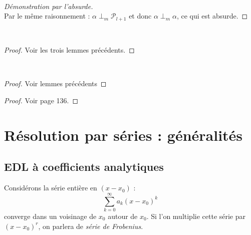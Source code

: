 	
	\ \\
	
\begin{proof} [Démonstration par l'absurde]\ \\
	Par le même raisonnement : $\alpha \perp_m \mathcal{P}_{l+1}$ et donc $\alpha 
	\perp_m \alpha$, ce qui est absurde.
\end{proof}
	
\ \\
	
\begin{proof}
	Voir les trois lemmes précédents.
\end{proof}
	
\ \\

\begin{proof}
	Voir lemmes précédents	
\end{proof}
	
	
\begin{proof}
	Voir page 136.
\end{proof}
	
	
\section{Résolution par séries : généralités}
	\subsection{EDL à coefficients analytiques}
	Considérons la série entière en $(x-x_0)$ :
	\begin{equation}
	\sum_{k=0}^\infty a_k(x-x_0)^k
	\end{equation}
	converge dans un voisinage de $x_0$ autour de $x_0$. Si l'on multiplie cette 
	série par $(x-x_0)^r$, on parlera de \textit{série de Frobenius}.\\

